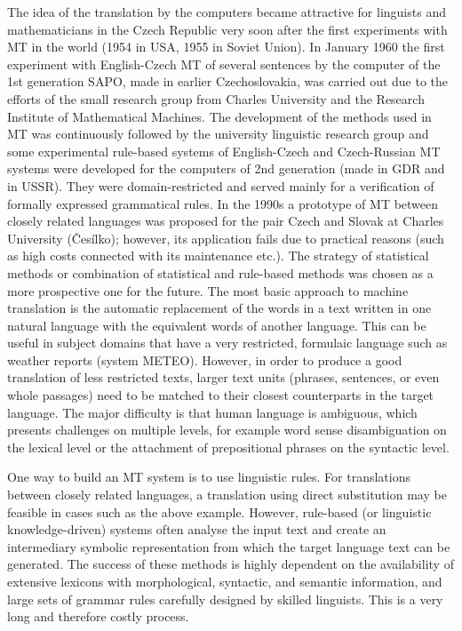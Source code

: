 \documentclass[]{../../metanetpaper}
\begin{document}
\begin{multicols}{2}
The idea of the translation by the computers became attractive for linguists and mathematicians in the Czech Republic very soon after the first experiments with MT in the world (1954 in USA, 1955 in Soviet Union). In January 1960 the first experiment with English-Czech MT of several sentences by the computer of the 1st generation SAPO, made in earlier Czechoslovakia, was carried out due to the efforts of the small research group from Charles University and the Research Institute of Mathematical Machines. The development of the methods used in MT was continuously followed by the university linguistic research group and some experimental rule-based systems of English-Czech and Czech-Russian MT systems were developed for the computers of 2nd generation (made in GDR and in USSR). They were domain-restricted and served mainly for a verification of formally expressed grammatical rules. In the 1990s a prototype of MT between closely related languages was proposed for the pair Czech and Slovak at Charles University (Česílko\cite{Note18}); however, its application fails due to practical reasons (such as high costs connected with its maintenance etc.). The strategy of statistical methods or combination of statistical and rule-based methods was chosen as a more prospective one for the future.
The most basic approach to machine translation is the automatic replacement of the words in a text written in one natural language with the equivalent words of another language. This can be useful in subject domains that have a very restricted, formulaic language such as weather reports (system METEO\cite{Note19}). However, in order to produce a good translation of less restricted texts, larger text units (phrases, sentences, or even whole passages) need to be matched to their closest counterparts in the target language. The major difficulty is that human language is ambiguous, which presents challenges on multiple levels, for example word sense disambiguation on the lexical level or the attachment of prepositional phrases on the syntactic level.

One way to build an MT system is to use linguistic rules. For translations between closely related languages, a translation using direct substitution may be feasible in cases such as the above example. However, rule-based (or linguistic knowledge-driven) systems often analyse the input text and create an intermediary symbolic representation from which the target language text can be generated. The success of these methods is highly dependent on the availability of extensive lexicons with morphological, syntactic, and semantic information, and large sets of grammar rules carefully designed by skilled linguists. This is a very long and therefore costly process.


\end{multicols}
\end{document}

